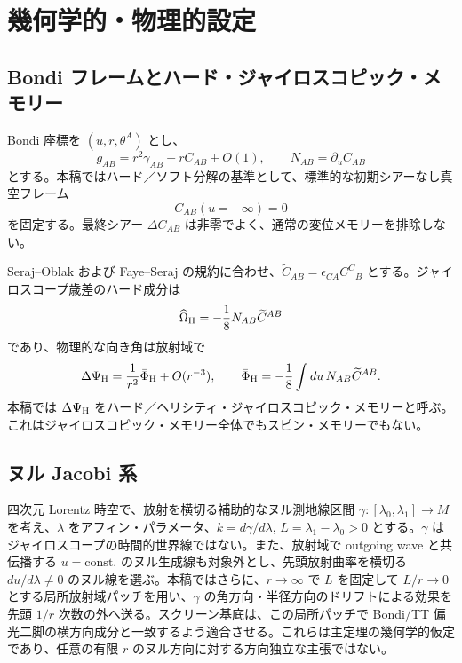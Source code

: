 \section{幾何学的・物理的設定}
\subsection{Bondi フレームとハード・ジャイロスコピック・メモリー}
Bondi 座標を $(u,r,\theta^A)$ とし、
\[
g_{AB}=r^2\gamma_{AB}+rC_{AB}+O(1),\qquad N_{AB}=\partial_u C_{AB}
\]
とする。本稿ではハード／ソフト分解の基準として、標準的な初期シアーなし真空フレーム
\begin{equation}
C_{AB}(u=-\infty)=0
\label{eq:early-shear-free}
\end{equation}
を固定する。最終シアー $\Delta C_{AB}$ は非零でよく、通常の変位メモリーを排除しない。

Seraj--Oblak および Faye--Seraj の規約に合わせ、$\widetilde C_{AB}=\epsilon_{CA}C^C{}_B$ とする。ジャイロスコープ歳差のハード成分は
\begin{equation}
\widehat\Omega_{\rm H}=-\frac18N_{AB}\widetilde C^{AB}
\label{eq:hard-precession}
\end{equation}
であり、物理的な向き角は放射域で
\begin{equation}
\Delta\Psi_{\rm H}=\frac{1}{r^2}\bar\Phi_{\rm H}+O(r^{-3}),\qquad
\bar\Phi_{\rm H}=-\frac18\int du\,N_{AB}\widetilde C^{AB}.
\label{eq:hard-memory}
\end{equation}
本稿では $\Delta\Psi_{\rm H}$ をハード／ヘリシティ・ジャイロスコピック・メモリーと呼ぶ。これはジャイロスコピック・メモリー全体でもスピン・メモリーでもない\cite{SerajOblak2023,FayeSeraj2025}。

\subsection{ヌル Jacobi 系}
四次元 Lorentz 時空で、放射を横切る補助的なヌル測地線区間 $\gamma:[\lambda_0,\lambda_1]\to M$ を考え、$\lambda$ をアフィン・パラメータ、$k=d\gamma/d\lambda$, $L=\lambda_1-\lambda_0>0$ とする。$\gamma$ はジャイロスコープの時間的世界線ではない。また、放射域で outgoing wave と共伝播する $u=\mathrm{const.}$ のヌル生成線も対象外とし、先頭放射曲率を横切る $du/d\lambda\neq0$ のヌル線を選ぶ。本稿ではさらに、$r\to\infty$ で $L$ を固定して $L/r\to0$ とする局所放射域パッチを用い、$\gamma$ の角方向・半径方向のドリフトによる効果を先頭 $1/r$ 次数の外へ送る。スクリーン基底は、この局所パッチで Bondi/TT 偏光二脚の横方向成分と一致するよう適合させる。これらは主定理の幾何学的仮定であり、任意の有限 $r$ のヌル方向に対する方向独立な主張ではない。


